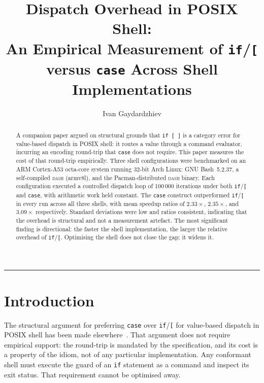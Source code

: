 \documentclass[11pt,a4paper]{article}
\begin{document}
\title{Dispatch Overhead in POSIX Shell:\\[4pt]
\large An Empirical Measurement of \texttt{if}/\texttt{[}
versus \texttt{case} Across Shell Implementations}

\author{Ivan Gaydardzhiev}
\date{}

\maketitle

\begin{abstract}
\noindent
A companion paper argued on structural grounds that \texttt{if~[~]}
is a category error for value-based dispatch in POSIX shell: it routes
a value through a command evaluator, incurring an encoding round-trip
that \texttt{case} does not require.
This paper measures the cost of that round-trip empirically.
Three shell configurations were benchmarked on an ARM Cortex-A53
octa-core system running 32-bit Arch Linux: GNU Bash~5.2.37,
a self-compiled \textsc{dash} (armv8l), and the Pacman-distributed
\textsc{dash} binary.
Each configuration executed a controlled dispatch loop of
100\,000 iterations under both \texttt{if}/\texttt{[} and
\texttt{case}, with arithmetic work held constant.
The \texttt{case} construct outperformed \texttt{if}/\texttt{[} in
every run across all three shells, with mean speedup ratios of
$2.33\times$, $2.35\times$, and $3.09\times$ respectively.
Standard deviations were low and ratios consistent, indicating that
the overhead is structural and not a measurement artefact.
The most significant finding is directional: the faster the shell
implementation, the larger the relative overhead of \texttt{if}/\texttt{[}.
Optimising the shell does not close the gap; it widens it.
\end{abstract}

\vspace{6pt}
\noindent\rule{\linewidth}{0.4pt}
\vspace{4pt}

\section{Introduction}

The structural argument for preferring \texttt{case} over
\texttt{if}/\texttt{[} for value-based dispatch in POSIX shell
has been made elsewhere~\cite{ecnb2026}.
That argument does not require empirical support: the round-trip
is mandated by the specification, and its cost is a property of
the idiom, not of any particular implementation.
Any conformant shell must execute the guard of an \texttt{if}
statement as a command and inspect its exit status.
That requirement cannot be optimised away.
\end{document}
